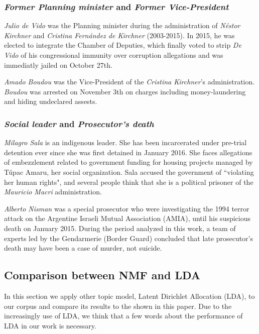 \documentclass{bmcart}
\begin{document}
\subsubsection*{\emph{Former Planning minister} and \emph{Former Vice-President}}

\par \emph{Julio de Vido} was the Planning minister during the administration of \emph{N\'estor Kirchner} and \emph{Cristina Fern\'andez de Kirchner} (2003-2015). In 2015, he was elected to integrate the Chamber of Deputies, which finally voted to strip \emph{De Vido} of his congressional immunity over corruption allegations and was immediatly jailed on October 27th.

\par \emph{Amado Boudou} was the Vice-President of the \emph{Cristina Kirchner}'s administration.
\emph{Boudou} was arrested on November 3th on charges including money-laundering and hiding undeclared assests.

\subsubsection*{\emph{Social leader} and \emph{Prosecutor's death}}

\par \emph{Milagro Sala} is an indigenous leader. 
She has been incarcerated under pre-trial detention ever since she was first detained in January 2016. She faces allegations of embezzlement related to government funding for housing projects managed by T\'upac Amaru, her social organization.
Sala accused the government of ``violating her human rights", and several people think that she is a political prisoner of the \emph{Mauricio Macri} administration.

\par \emph{Alberto Nisman} was a special prosecutor who were investigating the 1994 terror attack on the Argentine Israeli Mutual Association (AMIA), until his suspicious death on January 2015.
During the period analyzed in this work, a team of experts led by the Gendarmerie (Border Guard) concluded that late prosecutor's death may have been a case of murder, not suicide.


\subsection*{Comparison between NMF and LDA}

\par In this section we apply other topic model, Latent Dirichlet Allocation \cite{blei2003latent} (LDA), to our corpus and compare its results to the shown in this paper. Due to the increasingly use of LDA, we think that a few words about the performance of LDA in our work is necessary. 
\end{document}
